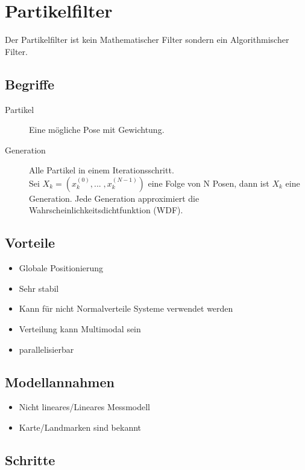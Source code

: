 \chapter{Partikelfilter}
\label{chp:partikelfilter}

Der Partikelfilter ist kein Mathematischer Filter sondern ein Algorithmischer Filter. \\

\section{Begriffe}
\begin{description}
	\item[Partikel] Eine mögliche Pose mit Gewichtung. 
	\item[Generation] Alle Partikel in einem Iterationsschritt. \\Sei $X_k = (x_k^{(0)},...\;,x_k^{(N-1)})$ eine Folge von N Posen, dann ist $X_k$ eine Generation. Jede Generation approximiert die Wahrscheinlichkeitsdichtfunktion (WDF).
\end{description}

\section{Vorteile}
\begin{itemize}
	\item Globale Positionierung
	\item Sehr stabil
	\item Kann für nicht Normalverteile Systeme verwendet werden
	\item Verteilung kann Multimodal sein
	\item parallelisierbar
\end{itemize}

\section{Modellannahmen}

\begin{itemize}
	\item Nicht lineares/Lineares Messmodell
	\item Karte/Landmarken sind bekannt
\end{itemize}

\section{Schritte}

